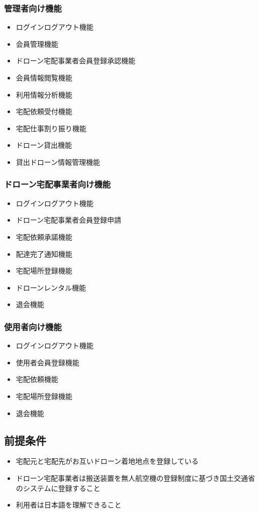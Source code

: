 \documentclass[a4paper, titlepage]{jsarticle}
\begin{document}
\subsubsection{管理者向け機能}
\begin{itemize}
    \item ログインログアウト機能
    \item 会員管理機能
    \item ドローン宅配事業者会員登録承認機能
    \item 会員情報閲覧機能
    \item 利用情報分析機能
    \item 宅配依頼受付機能
    \item 宅配仕事割り振り機能
    \item ドローン貸出機能
    \item 貸出ドローン情報管理機能
\end{itemize}
\subsubsection{ドローン宅配事業者向け機能}
\begin{itemize}
    \item ログインログアウト機能
    \item ドローン宅配事業者会員登録申請
    \item 宅配依頼承諾機能
    \item 配達完了通知機能
    \item 宅配場所登録機能
    \item ドローンレンタル機能
    \item 退会機能
\end{itemize}
\subsubsection{使用者向け機能}
\begin{itemize}
    \item ログインログアウト機能
    \item 使用者会員登録機能
    \item 宅配依頼機能
    \item 宅配場所登録機能
    \item 退会機能
\end{itemize}
\subsection{前提条件}
\begin{itemize}
	\item 宅配元と宅配先がお互いドローン着地地点を登録している
	\item ドローン宅配事業者は搬送装置を無人航空機の登録制度に基づき国土交通省のシステムに登録すること
	\item 利用者は日本語を理解できること
\end{itemize}
\end{document}
